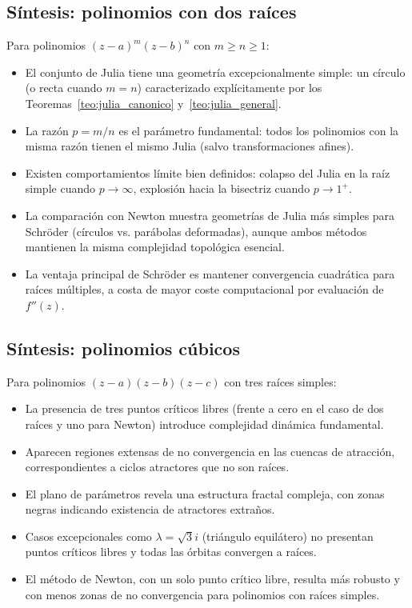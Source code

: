 \subsection{Síntesis: polinomios con dos raíces}

Para polinomios $(z-a)^m(z-b)^n$ con $m\ge n\ge 1$:

\begin{itemize}
\item El conjunto de Julia tiene una geometría excepcionalmente simple: un círculo (o recta cuando $m=n$) caracterizado explícitamente por los Teoremas~\ref{teo:julia_canonico} y~\ref{teo:julia_general}.

\item La razón $p=m/n$ es el parámetro fundamental: todos los polinomios con la misma razón tienen el mismo Julia (salvo transformaciones afines).

\item Existen comportamientos límite bien definidos: colapso del Julia en la raíz simple cuando $p\to\infty$, explosión hacia la bisectriz cuando $p\to 1^+$.

\item La comparación con Newton muestra geometrías de Julia más simples para Schröder (círculos vs. parábolas deformadas), aunque ambos métodos mantienen la misma complejidad topológica esencial.

\item La ventaja principal de Schröder es mantener convergencia cuadrática para raíces múltiples, a costa de mayor coste computacional por evaluación de $f''(z)$.
\end{itemize}

\subsection{Síntesis: polinomios cúbicos}

Para polinomios $(z-a)(z-b)(z-c)$ con tres raíces simples:

\begin{itemize}
\item La presencia de tres puntos críticos libres (frente a cero en el caso de dos raíces y uno para Newton) introduce complejidad dinámica fundamental.

\item Aparecen regiones extensas de no convergencia en las cuencas de atracción, correspondientes a ciclos atractores que no son raíces.

\item El plano de parámetros revela una estructura fractal compleja, con zonas negras indicando existencia de atractores extraños.

\item Casos excepcionales como $\lambda=\sqrt{3}i$ (triángulo equilátero) no presentan puntos críticos libres y todas las órbitas convergen a raíces.

\item El método de Newton, con un solo punto crítico libre, resulta más robusto y con menos zonas de no convergencia para polinomios con raíces simples.
\end{itemize}

